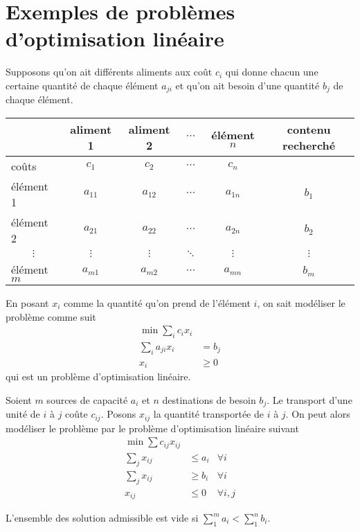 
\annexe

\section{Exemples de problèmes d'optimisation linéaire}
\begin{myexem}
  Supposons qu'on ait différents aliments aux coût $c_i$
  qui donne chacun une certaine quantité de chaque élément $a_{ji}$ et
  qu'on ait besoin d'une quantité $b_j$ de chaque élément.
  \begin{center}
    \begin{tabular}{|l|c|c|c|c|c|}
      \hline
      & aliment 1 & aliment 2 & $\cdots$ & élément $n$ & contenu recherché\\
      \hline
      coûts & $c_1$ & $c_2$ & $\cdots$ & $c_n$ & \\
      \hline
      élément 1 & $a_{11}$ & $a_{12}$ & $\cdots$ & $a_{1n}$ & $b_1$\\
      \hline
      élément 2 & $a_{21}$ & $a_{22}$ & $\cdots$ & $a_{2n}$ & $b_2$\\
      \hline
      \multicolumn{1}{|c|}{$\vdots$} & $\vdots$ & $\vdots$
      & $\ddots$ & $\vdots$ & $\vdots$\\
      \hline
      élément $m$ & $a_{m1}$ & $a_{m2}$ & $\cdots$ & $a_{mn}$ & $b_m$\\
      \hline
    \end{tabular}
  \end{center}
  En posant $x_i$ comme la quantité qu'on prend de l'élément $i$,
  on sait modéliser le problème comme suit
  \begin{align*}
    \min \sum_i c_i x_i\\
    \sum_i a_{ji} x_i & = b_j\\
    x_i & \geq 0
  \end{align*}
  qui est un problème d'optimisation linéaire.
\end{myexem}

\begin{myexem}
  Soient $m$ sources de capacité $a_i$ et
  $n$ destinations de besoin $b_j$.
  Le transport d'une unité de $i$ à $j$ coûte $c_{ij}$.
  Posons $x_{ij}$ la quantité transportée de $i$ à $j$.
  On peut alors modéliser le problème par le problème d'optimisation linéaire
  suivant
  \begin{align*}
    \min \sum c_{ij} x_{ij}\\
    \sum_j x_{ij} & \leq a_i & \forall i\\
    \sum_j x_{ij} & \geq b_i & \forall i\\
    x_{ij} & \leq 0 & \forall i,j
  \end{align*}

  L'ensemble des solution admissible est vide si
  $\sum_1^m a_i < \sum_1^n b_i$.
\end{myexem}

